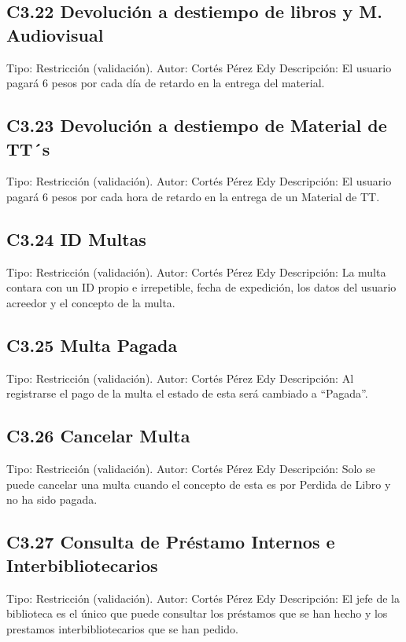 \subsection{C3.22 Devolución a destiempo de libros y M. Audiovisual }
	\UCli Tipo: Restricción (validación).
	\UCli Autor: Cortés Pérez Edy
	\UCli Descripción: El usuario pagará 6 pesos por cada día de retardo en la entrega del material.
	
\subsection{C3.23 Devolución a destiempo de Material de TT´s}
	\UCli Tipo: Restricción (validación).
	\UCli Autor: Cortés Pérez Edy
	\UCli Descripción: El usuario pagará 6 pesos por cada hora de retardo en la entrega de un Material de TT.
	
\subsection{C3.24 ID Multas }
	\UCli Tipo: Restricción (validación).
	\UCli Autor: Cortés Pérez Edy
	\UCli Descripción: La multa contara con un ID propio e irrepetible, fecha de expedición, los datos del usuario acreedor y el concepto de la multa.
	
\subsection{C3.25 Multa Pagada }
	\UCli Tipo: Restricción (validación).
	\UCli Autor: Cortés Pérez Edy
	\UCli Descripción: Al registrarse el pago de la multa el estado de esta será cambiado a “Pagada”.
	
\subsection{C3.26 Cancelar Multa }
	\UCli Tipo: Restricción (validación).
	\UCli Autor: Cortés Pérez Edy
	\UCli Descripción: Solo se puede cancelar una multa cuando el concepto de esta es por Perdida de Libro y no ha sido pagada.
	
\subsection{C3.27 Consulta de Préstamo Internos e Interbibliotecarios }
	\UCli Tipo: Restricción (validación).
	\UCli Autor: Cortés Pérez Edy
	\UCli Descripción: El jefe de la biblioteca es el único que puede consultar los préstamos que se han hecho y los prestamos interbibliotecarios que se han pedido.
	
